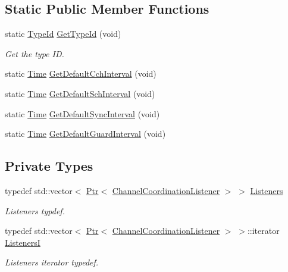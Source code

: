 \subsection*{Static Public Member Functions}
\begin{DoxyCompactItemize}
\item 
static \hyperlink{classns3_1_1TypeId}{Type\+Id} \hyperlink{classns3_1_1ChannelCoordinator_ad0ecce366d38ccb6436397122e6c2937}{Get\+Type\+Id} (void)
\begin{DoxyCompactList}\small\item\em Get the type ID. \end{DoxyCompactList}\item 
static \hyperlink{classns3_1_1Time}{Time} \hyperlink{classns3_1_1ChannelCoordinator_aea52b9fa7e6b91ee2c4ee2c0794fccca}{Get\+Default\+Cch\+Interval} (void)
\item 
static \hyperlink{classns3_1_1Time}{Time} \hyperlink{classns3_1_1ChannelCoordinator_aab8ba71c5176772aeb89ae6cd94b159b}{Get\+Default\+Sch\+Interval} (void)
\item 
static \hyperlink{classns3_1_1Time}{Time} \hyperlink{classns3_1_1ChannelCoordinator_af15f2017e330ee3b96db01b6af167204}{Get\+Default\+Sync\+Interval} (void)
\item 
static \hyperlink{classns3_1_1Time}{Time} \hyperlink{classns3_1_1ChannelCoordinator_a0a53ca7bec0da846955eb7c0a8aec8ed}{Get\+Default\+Guard\+Interval} (void)
\end{DoxyCompactItemize}
\subsection*{Private Types}
\begin{DoxyCompactItemize}
\item 
typedef std\+::vector$<$ \hyperlink{classns3_1_1Ptr}{Ptr}$<$ \hyperlink{classns3_1_1ChannelCoordinationListener}{Channel\+Coordination\+Listener} $>$ $>$ \hyperlink{classns3_1_1ChannelCoordinator_adafd85a4ced25d5fbdf018a826c20ea3}{Listeners}
\begin{DoxyCompactList}\small\item\em Listeners typdef. \end{DoxyCompactList}\item 
typedef std\+::vector$<$ \hyperlink{classns3_1_1Ptr}{Ptr}$<$ \hyperlink{classns3_1_1ChannelCoordinationListener}{Channel\+Coordination\+Listener} $>$ $>$\+::iterator \hyperlink{classns3_1_1ChannelCoordinator_a607006d08c2338504cdfe7ceaa22c51f}{ListenersI}
\begin{DoxyCompactList}\small\item\em Listeners iterator typedef. \end{DoxyCompactList}\end{DoxyCompactItemize}
